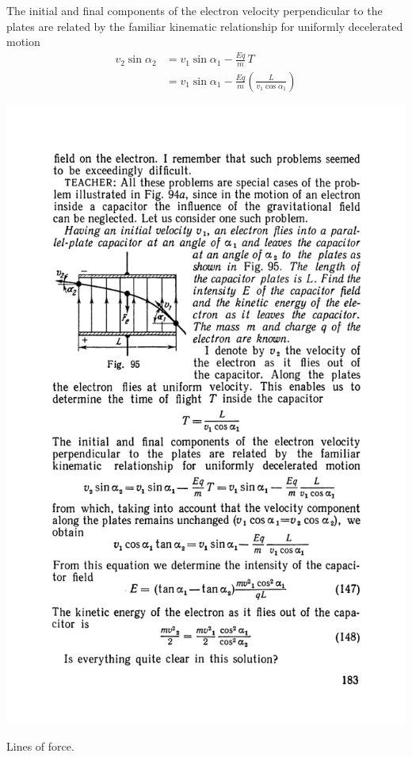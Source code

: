 \documentclass[a4paper,sfsidenotes]{tufte-book}
\begin{document}
The initial and final components of the electron velocity perpendicular to the plates are related by the familiar kinematic relationship for uniformly decelerated motion
\begin{align*}
v_{2} \sin \alpha_{2} & = v_{1} \sin \alpha_{1} - \frac{Eq}{m} \, T \\
& = v_{1} \sin \alpha_{1} - \frac{Eq}{m} \left( \frac{L}{v_{1} \cos \alpha_{1}} \right)
\end{align*}
\begin{marginfigure}%
\centering
\includegraphics[width=\linewidth]{fig-095a}
\caption{Lines of force.}
\label{fig-95}
\end{marginfigure}
\end{document}
